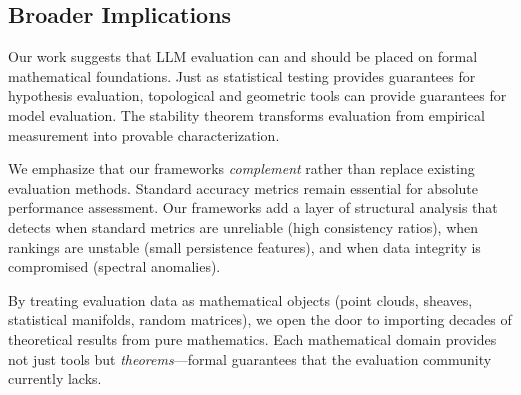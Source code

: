 \subsection{Broader Implications}

Our work suggests that LLM evaluation can and should be placed on formal mathematical foundations.
Just as statistical testing provides guarantees for hypothesis evaluation, topological and geometric tools can provide guarantees for model evaluation.
The stability theorem transforms evaluation from empirical measurement into provable characterization.

We emphasize that our frameworks \emph{complement} rather than replace existing evaluation methods.
Standard accuracy metrics remain essential for absolute performance assessment.
Our frameworks add a layer of structural analysis that detects when standard metrics are unreliable (high consistency ratios), when rankings are unstable (small persistence features), and when data integrity is compromised (spectral anomalies).

By treating evaluation data as mathematical objects (point clouds, sheaves, statistical manifolds, random matrices), we open the door to importing decades of theoretical results from pure mathematics.
Each mathematical domain provides not just tools but \emph{theorems}---formal guarantees that the evaluation community currently lacks.
